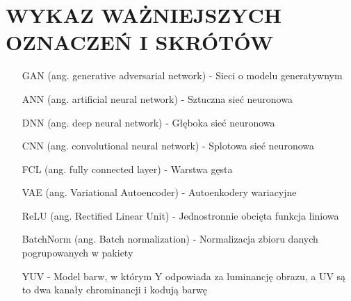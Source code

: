 \section*{WYKAZ WAŻNIEJSZYCH OZNACZEŃ I SKRÓTÓW}

  \bigskip

  \begin{itemize}
    \item[GAN] (ang. generative adversarial network) - Sieci o modelu generatywnym
    \item[ANN] (ang. artificial neural network) - Sztuczna sieć neuronowa
    \item[DNN] (ang. deep neural network) - Głęboka sieć neuronowa
    \item[CNN] (ang. convolutional neural network) - Splotowa sieć neuronowa
    \item[FCL] (ang. fully connected layer) - Warstwa gęsta
    \item[VAE] (ang. Variational Autoencoder) - Autoenkodery wariacyjne
    \item[ReLU] (ang. Rectified Linear Unit) - Jednostronnie obcięta funkcja liniowa
    \item[BatchNorm] (ang. Batch normalization) - Normalizacja zbioru danych
    pogrupowanych w pakiety
    \item[YUV] - Model barw, w którym Y odpowiada za luminancję obrazu, a UV
    są to dwa kanały chrominancji i kodują barwę

  \end{itemize}
